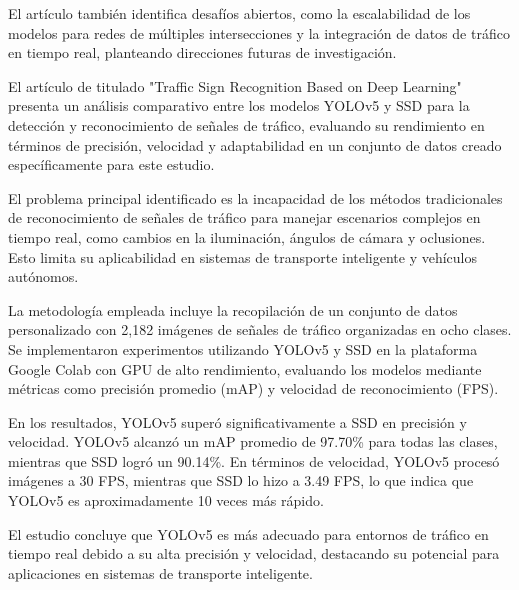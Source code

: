 El artículo también identifica desafíos abiertos, como la escalabilidad de los modelos para redes de múltiples intersecciones y la integración de datos de tráfico en tiempo real, planteando direcciones futuras de investigación.

El artículo de \cite{Zhu2022} titulado "Traffic Sign Recognition Based on Deep Learning" presenta un análisis comparativo entre los modelos YOLOv5 y SSD para la detección y reconocimiento de señales de tráfico, evaluando su rendimiento en términos de precisión, velocidad y adaptabilidad en un conjunto de datos creado específicamente para este estudio.

El problema principal identificado es la incapacidad de los métodos tradicionales de reconocimiento de señales de tráfico para manejar escenarios complejos en tiempo real, como cambios en la iluminación, ángulos de cámara y oclusiones. Esto limita su aplicabilidad en sistemas de transporte inteligente y vehículos autónomos.

La metodología empleada incluye la recopilación de un conjunto de datos personalizado con 2,182 imágenes de señales de tráfico organizadas en ocho clases. Se implementaron experimentos utilizando YOLOv5 y SSD en la plataforma Google Colab con GPU de alto rendimiento, evaluando los modelos mediante métricas como precisión promedio (mAP) y velocidad de reconocimiento (FPS).

En los resultados, YOLOv5 superó significativamente a SSD en precisión y velocidad. YOLOv5 alcanzó un mAP promedio de 97.70\% para todas las clases, mientras que SSD logró un 90.14\%. En términos de velocidad, YOLOv5 procesó imágenes a 30 FPS, mientras que SSD lo hizo a 3.49 FPS, lo que indica que YOLOv5 es aproximadamente 10 veces más rápido.

El estudio concluye que YOLOv5 es más adecuado para entornos de tráfico en tiempo real debido a su alta precisión y velocidad, destacando su potencial para aplicaciones en sistemas de transporte inteligente.

